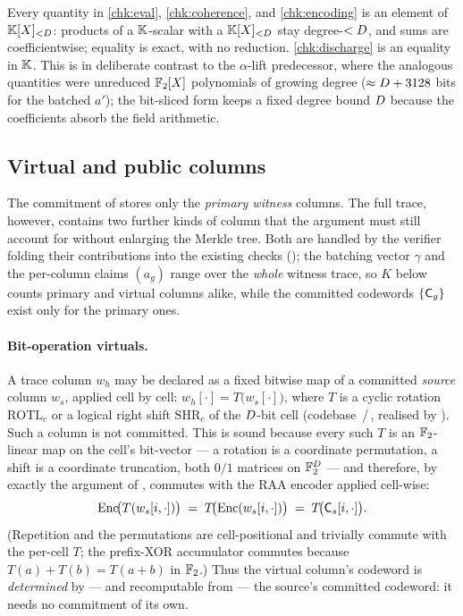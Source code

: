 \begin{remark}
Every quantity in \ref{chk:eval}, \ref{chk:coherence}, and
\ref{chk:encoding} is an element of $\mathbb{K}[X]_{<D}$: products of a
$\mathbb{K}$-scalar with a $\mathbb{K}[X]_{<D}$ stay degree-$<D$, and sums are
coefficientwise; equality is exact, with no reduction.
\ref{chk:discharge} is an equality in $\mathbb{K}$. This is in deliberate contrast to the $\alpha$-lift
predecessor, where the analogous quantities were unreduced $\mathbb{F}_2[X]$
polynomials of growing degree ($\approx D + 3128$ bits for the
batched $a'$); the bit-sliced form keeps a fixed degree bound $D$
because the coefficients absorb the field arithmetic.
\end{remark}

\subsection{Virtual and public columns}
\label{sec:virtuals}

The commitment of  stores only the \emph{primary
witness} columns. The full trace, however, contains two further kinds of
column that the argument must still account for without enlarging the
Merkle tree. Both are handled by the verifier folding their contributions
into the existing checks (); the
batching vector $\gamma$ and the per-column claims $(a_g)$ range over the
\emph{whole} witness trace, so $K$ below counts primary and virtual
columns alike, while the committed codewords $\{\mathsf{C}_g\}$ exist only
for the primary ones.

\paragraph{Bit-operation virtuals.}
A trace column $w_h$ may be declared as a fixed bitwise map of a committed
\emph{source} column $w_s$, applied cell by cell:
$w_h[\cdot] = T\!\bigl(w_s[\cdot]\bigr)$, where $T$ is a cyclic rotation
$\mathrm{ROTL}_c$ or a logical right shift $\mathrm{SHR}_c$ of the
$D$-bit cell (codebase \,/\,,
realised by ). Such a column is not committed.
This is sound because every such $T$ is an $\mathbb{F}_2$-linear map on the
cell's bit-vector --- a rotation is a coordinate permutation, a shift is a
coordinate truncation, both $0/1$ matrices on $\mathbb{F}_2^{D}$ --- and
therefore, by exactly the argument of , commutes with
the RAA encoder applied cell-wise:
\begin{equation}
  \label{eq:virtual-commute}
  \operatorname{Enc}\!\bigl(T(w_s[i,\cdot])\bigr)
  \;=\; T\!\bigl(\operatorname{Enc}(w_s[i,\cdot])\bigr)
  \;=\; T\!\bigl(\mathsf{C}_s[i,\cdot]\bigr).
\end{equation}
(Repetition and the permutations are cell-positional and trivially
commute with the per-cell $T$; the prefix-XOR accumulator commutes because
$T(a)+T(b)=T(a+b)$ in $\mathbb{F}_2$.) Thus the virtual column's codeword is
\emph{determined} by --- and recomputable from --- the source's committed
codeword: it needs no commitment of its own.

